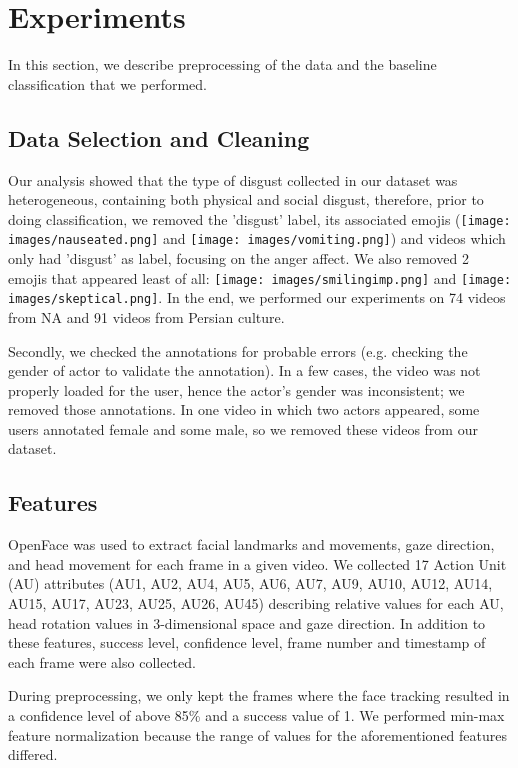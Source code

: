 \documentclass[letterpaper, 10 pt, conference]{ieeeconf}  \usepackage{FG2021}
\begin{document}
\section{Experiments}
In this section, we describe preprocessing of the data and the baseline classification that we performed.


\subsection{Data Selection and Cleaning}
Our analysis showed that the type of disgust collected in our dataset was heterogeneous, containing both physical and social disgust, therefore, prior to doing classification, we removed the 'disgust' label, its associated emojis (\texttt{[image: images/nauseated.png]} and \texttt{[image: images/vomiting.png]}) and videos which only had 'disgust' as label, focusing on the anger affect. We also removed 2 emojis that appeared least of all: \texttt{[image: images/smilingimp.png]} and \texttt{[image: images/skeptical.png]}. In the end, we performed our experiments on 74 videos from NA and 91 videos from Persian culture.


Secondly, we checked the annotations for probable errors (e.g. checking the gender of actor to validate the annotation). In a few cases, the video was not properly loaded for the user, hence the actor's gender was inconsistent; we removed those annotations. In one video in which two actors appeared, some users annotated female and some male, so we removed these videos from our dataset. 

\subsection{Features}
OpenFace \cite{openface} was used to extract facial landmarks and movements, gaze direction, and head movement for each frame in a given video.  We collected 17 Action Unit (AU) attributes (AU1, AU2, AU4, AU5, AU6, AU7, AU9, AU10, AU12, AU14, AU15, AU17, AU23, AU25, AU26, AU45) describing relative values for each AU, head rotation values in 3-dimensional space and gaze direction. In addition to these features, success level, confidence level, frame number and timestamp of each frame were also collected.

During preprocessing, we only kept the frames where the face tracking resulted in a confidence level of above 85\% and a success value of 1. We performed min-max feature normalization because the range of values for the aforementioned features differed.
\end{document}
